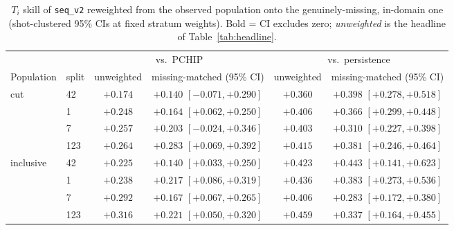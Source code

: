 \documentclass[10pt]{article}
\newcommand{\Ti}{\ensuremath{T_i}}
\newcommand{\seqv}{\texttt{seq\_v2}}
\begin{document}
\begin{table}[t]
  \centering
  \caption{\Ti{} skill of \seqv{} reweighted from the observed population onto the
  genuinely-missing, in-domain one (shot-clustered 95\% CIs at fixed stratum
  weights). Bold = CI excludes zero; \emph{unweighted} is the headline of
  Table~\ref{tab:headline}.}
  \label{tab:mnar}
  \small
  \begin{tabular}{llcccc}
    \toprule
    & & \multicolumn{2}{c}{vs.\ PCHIP} & \multicolumn{2}{c}{vs.\ persistence} \\
    \cmidrule(lr){3-4}\cmidrule(lr){5-6}
    Population & split & unweighted & missing-matched (95\% CI) & unweighted & missing-matched (95\% CI) \\
    \midrule
    \multirow{4}{*}{cut}
      & 42  & $+0.174$ & $+0.140$ $[-0.071, +0.290]$ & $+0.360$ & $\mathbf{+0.398}$ $[+0.278, +0.518]$ \\
      & 1   & $+0.248$ & $\mathbf{+0.164}$ $[+0.062, +0.250]$ & $+0.406$ & $\mathbf{+0.366}$ $[+0.299, +0.448]$ \\
      & 7   & $+0.257$ & $+0.203$ $[-0.024, +0.346]$ & $+0.403$ & $\mathbf{+0.310}$ $[+0.227, +0.398]$ \\
      & 123 & $+0.264$ & $\mathbf{+0.283}$ $[+0.069, +0.392]$ & $+0.415$ & $\mathbf{+0.381}$ $[+0.246, +0.464]$ \\
    \midrule
    \multirow{4}{*}{inclusive}
      & 42  & $+0.225$ & $\mathbf{+0.140}$ $[+0.033, +0.250]$ & $+0.423$ & $\mathbf{+0.443}$ $[+0.141, +0.623]$ \\
      & 1   & $+0.238$ & $\mathbf{+0.217}$ $[+0.086, +0.319]$ & $+0.436$ & $\mathbf{+0.383}$ $[+0.273, +0.536]$ \\
      & 7   & $+0.292$ & $\mathbf{+0.167}$ $[+0.067, +0.265]$ & $+0.406$ & $\mathbf{+0.283}$ $[+0.172, +0.380]$ \\
      & 123 & $+0.316$ & $\mathbf{+0.221}$ $[+0.050, +0.320]$ & $+0.459$ & $\mathbf{+0.337}$ $[+0.164, +0.455]$ \\
    \bottomrule
  \end{tabular}
\end{table}
\end{document}
